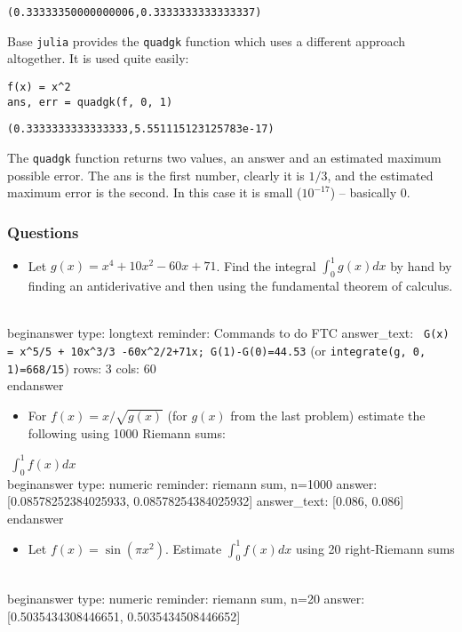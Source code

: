 \documentclass[12pt]{article}
\begin{document}
\begin{verbatim}
(0.33333350000000006,0.3333333333333337)\end{verbatim}
\newline
Base \texttt{julia} provides the \texttt{quadgk} function which uses a different approach altogether. It is used quite easily:\begin{verbatim}
f(x) = x^2
ans, err = quadgk(f, 0, 1)
\end{verbatim}
\begin{verbatim}
(0.3333333333333333,5.551115123125783e-17)\end{verbatim}
\newline
The \texttt{quadgk} function returns two values, an answer and an estimated maximum possible error.  The ans is the first number, clearly it is $1/3$, and the estimated maximum error is the second. In this case it is small ($10^{-17}$) – basically 0.\subsubsection{Questions}\begin{itemize}\item Let $g(x) = x^4 + 10x^2 - 60x + 71$. Find the integral $\int_0^1   g(x) dx$ by hand by finding an antiderivative and then using the fundamental theorem of calculus.\end{itemize}
\\begin{answer}
type: longtext
reminder: Commands to do FTC
answer_text: \verb# G(x) = x^5/5 + 10x^3/3 -60x^2/2+71x; G(1)-G(0)=44.53# (or \verb#integrate(g, 0, 1)=668/15#) 
rows: 3
cols: 60
\\end{answer}
\begin{itemize}\item For $f(x) = x/\sqrt{g(x)}$ (for $g(x)$ from the last problem) estimate the following using 1000 Riemann sums:\end{itemize}$~
\int_0^1 f(x) dx
~$
\\begin{answer}
    type: numeric
    reminder: riemann sum, n=1000
    answer: [0.08578252384025933, 0.08578254384025932]
    answer_text: [0.086, 0.086] 
\\end{answer}
\begin{itemize}\item Let $f(x) = \sin(\pi x^2)$. Estimate $\int_0^1 f(x) dx$ using 20 right-Riemann sums\end{itemize}
\\begin{answer}
    type: numeric
    reminder: riemann sum, n=20
    answer: [0.5035434308446651, 0.5035434508446652]
\end{document}
